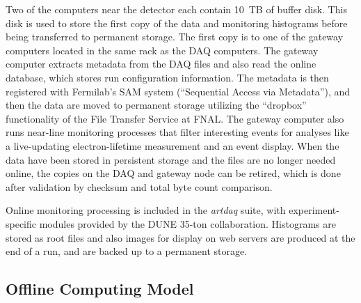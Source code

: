 
Two of the computers near the detector each contain 10~TB of buffer disk.  This disk is used to store the first copy of
the data and monitoring histograms before being transferred to permanent storage.
The first copy is to one of the gateway computers located in the same rack as the DAQ computers.  The gateway computer
extracts metadata from the DAQ files and also read the online database, which stores run configuration information.
The metadata is then registered with Fermilab's  SAM system
(``Sequential Access via Metadata''), and then the data are
moved to permanent storage utilizing the ``dropbox'' functionality of the File Transfer Service at FNAL.
The gateway computer also runs near-line monitoring processes that filter interesting events for analyses like
a live-updating electron-lifetime measurement and an event display.
When the data have been stored in persistent storage and the files are no longer needed online,
the copies on the DAQ and gateway node can be retired, which is done after validation by checksum and
total byte count comparison.

Online monitoring processing is included in the {\it artdaq} suite, with experiment-specific modules
provided by the DUNE 35-ton collaboration.  Histograms are stored as root files and also
images for display on web servers are produced at the end of a run, and are backed up to a permanent storage.


\subsection{Offline Computing Model}

